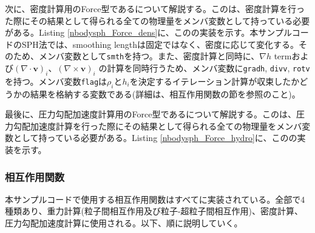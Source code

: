 次に、密度計算用のForce型であるについて解説する。この\structure は、密度計算を行った際にその結果として得られる全ての物理量をメンバ変数として持っている必要がある。Listing \ref{nbodysph_Force_dens}に、この\structure の実装を示す。本サンプルコードのSPH法では、smoothing lengthは固定ではなく、密度に応じて変化する。そのため、メンバ変数として\texttt{smth}を持つ。また、密度計算と同時に、$\nabla h$ termおよび$(\nabla\cdot\bm{v})_{i}$、$(\nabla\times\bm{v})_{i}$ の計算を同時行うため、メンバ変数に\texttt{gradh}, \texttt{divv}, \texttt{rotv}を持つ。メンバ変数\texttt{flag}は$\rho_{i}$と$h_{i}$を決定するイテレーション計算が収束したかどうかの結果を格納する変数である(詳細は、相互作用関数の節を参照のこと)。

\ifCpp %

\endifCpp
\ifFtn %

\endifFtn
\ifC %

\endifC

最後に、圧力勾配加速度計算用のForce型であるについて解説する。この\structure は、圧力勾配加速度計算を行った際にその結果として得られる全ての物理量をメンバ変数として持っている必要がある。Listing \ref{nbodysph_Force_hydro}に、この\structure の実装を示す。

\ifCpp %

\endifCpp
\ifFtn %

\endifFtn
\ifC %

\endifC


\subsubsection{相互作用関数}
本サンプルコードで使用する相互作用関数はすべてに実装されている。全部で4種類あり、重力計算(粒子間相互作用及び粒子-超粒子間相互作用)、密度計算、圧力勾配加速度計算に使用される。以下、順に説明していく。

